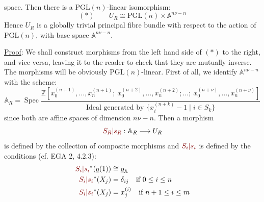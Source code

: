 
space. Then there is a $\mathrm{PGL}(n)$-linear isomorphism:
\[
(*)\qquad U_R\cong\mathrm{PGL}(n)\times\mathbb{A}^{n\nu-n}
\]
Hence $U_R$ is a globally trivial principal fibre bundle with respect to the action of $\mathrm{PGL}(n)$, with base space $\mathbb{A}^{n\nu-n}$.

\uline{Proof}: We shall construct morphisms from the left hand side of $(*)$ to the right, and vice versa, leaving it to the reader to check that they are mutually inverse. The morphisms will be obviously $\mathrm{PGL}(n)$-linear. First of all, we identify $\mathbb{A}^{n\nu-n}$ with the scheme:
\[
\mathbb{A}_R=\operatorname{Spec}
\frac{\mathbb{Z}[x_0^{(n+1)},\ldots,x_n^{(n+1)};\ x_0^{(n+2)},\ldots,x_n^{(n+2)};\ldots;\ x_0^{(n+\nu)},\ldots,x_n^{(n+\nu)}]}
{\text{Ideal generated by }\{x_i^{(n+k)}-1\mid i\in S_k\}}
\]
since both are affine spaces of dimension $n\nu-n$. Then a morphism
\[
\unsure{S_R|s_R}:\mathbb{A}_R\longrightarrow U_R
\]
is defined by the collection of composite morphisms
and $\unsure{S_i|s_i}$ is defined by the conditions (cf. EGA 2, 4.2.3):
\[
\begin{aligned}
\unsure{S_i|s_i}^*(\underline{o}(1))&\cong\underline{o}_{\mathbb{A}}\\
\unsure{S_i|s_i}^*(X_j)&=\delta_{ij}\quad\text{if }0\leq i\leq n\\
\unsure{S_i|s_i}^*(X_j)&=x_j^{(i)}\quad\text{if }n+1\leq i\leq m
\end{aligned}
\]

